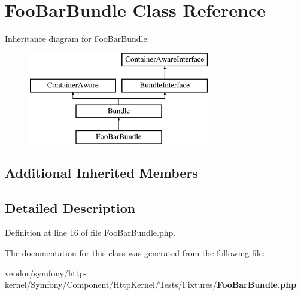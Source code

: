 \section{Foo\+Bar\+Bundle Class Reference}
\label{class_symfony_1_1_component_1_1_http_kernel_1_1_tests_1_1_fixtures_1_1_foo_bar_bundle}
Inheritance diagram for Foo\+Bar\+Bundle\+:\begin{figure}[H]
\begin{center}
\leavevmode
\includegraphics[height=4.000000cm]{class_symfony_1_1_component_1_1_http_kernel_1_1_tests_1_1_fixtures_1_1_foo_bar_bundle}
\end{center}
\end{figure}
\subsection*{Additional Inherited Members}


\subsection{Detailed Description}


Definition at line 16 of file Foo\+Bar\+Bundle.\+php.



The documentation for this class was generated from the following file\+:\begin{DoxyCompactItemize}
\item 
vendor/symfony/http-\/kernel/\+Symfony/\+Component/\+Http\+Kernel/\+Tests/\+Fixtures/{\bf Foo\+Bar\+Bundle.\+php}\end{DoxyCompactItemize}
